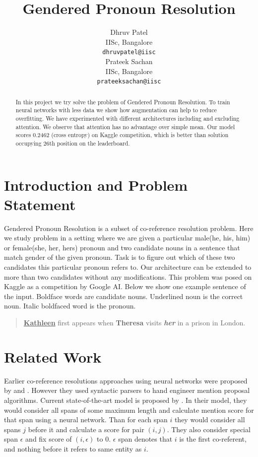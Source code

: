 \documentclass[11pt,a4paper]{article}
\title{Gendered Pronoun Resolution}
\author{Dhruv Patel \\
  IISc, Bangalore \\
  \texttt{dhruvpatel@iisc} \\\And
  Prateek Sachan \\
  IISc, Bangalore \\
  \texttt{prateeksachan@iisc} \\}
\date{}
\begin{document}
\maketitle
\begin{abstract}
  In this project we try solve the problem of Gendered Pronoun Resolution. To train neural networks with less data we show how augmentation can help to reduce overfitting. We have experimented with different architectures including and excluding attention. We observe that attention has no advantage over simple mean. Our model scores 0.2462 (cross entropy) on Kaggle competition, which is better than solution occupying 26th position on the leaderboard.
\end{abstract}

\section{Introduction and Problem Statement}
Gendered Pronoun Resolution is a subset of co-reference resolution problem. Here we study problem in a setting where we are given a particular male(he, his, him) or female(she, her, hers) pronoun and two candidate nouns in a sentence that match gender of the given pronoun. Task is to figure out which of these two candidates this particular pronoun refers to.  Our architecture can be extended to more than two candidates without any modifications. This problem was posed on Kaggle as a competition by Google AI. Below we show one example sentence of the input. Boldface words are candidate nouns. Underlined noun is the correct noun. Italic boldfaced word is the pronoun.
\begin{quote}
   \textbf{\underline{Kathleen}} first appears when \textbf{Theresa} visits \textbf{\textit{her}} in a prison in London.
\end{quote}

\section{Related Work}
Earlier co-reference resolutions approaches using neural networks were proposed by \citet{wiseman2016learning} and \citet{clarkmanning2016deep}. However they used syntactic parsers to hand engineer mention proposal algorithms. Current state-of-the-art model is proposed by \citet{lee2017end}. In their model, they would consider all spans of some maximum length and calculate mention score for that span using a neural network. Than for each span $i$ they would consider all spans $j$ before it and calculate a score for pair $(i, j)$. They also consider special span $\epsilon$ and fix score of $(i, \epsilon)$ to 0. $\epsilon$ span denotes that $i$ is the first co-referent, and nothing before it refers to same entity as $i$.
\end{document}
